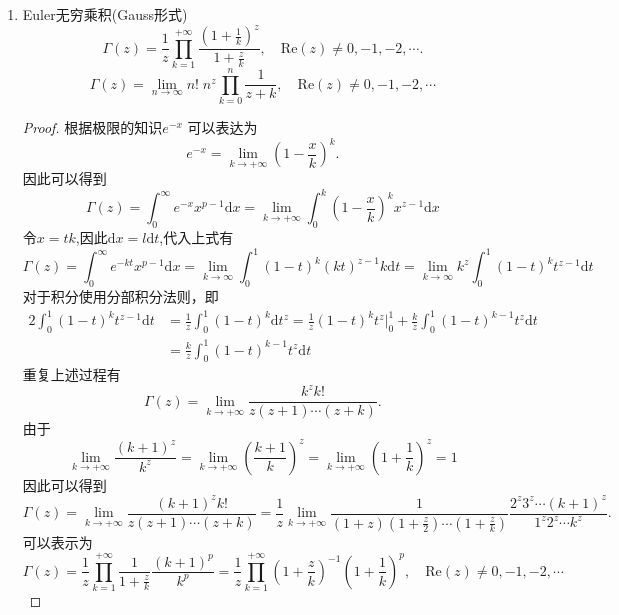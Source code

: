 \begin{property}
\begin{enumerate}[noitemsep]
\begin{enumerate}[noitemsep]
			\item Euler无穷乘积(Gauss形式)
			\begin{equation}
			\Gamma\left(z\right)=\frac{1}{z}\prod _{k=1}^{+\infty}{\frac {\left(1+\frac{1}{k}\right)^{z}}{1+{\frac{z}{k}}}},\quad \mathrm{Re}\left(z\right) \ne  0,-1,-2,\cdots.
			\end{equation}
			\begin{equation}
			\Gamma\left(z\right) = \lim_{n \to {\infty}} n! \; n^z\prod_{k=0}^{n}{\frac{1}{z+k}},\quad \mathrm{Re}(z) \ne 0,-1,-2,\cdots
			\end{equation}
			\begin{proof}	
				根据极限的知识$e^{-x}$
				可以表达为$$e^{-x}=\lim _{k \rightarrow +\infty}\left(1-\frac{x}{k}\right)^{k}.$$		
				因此可以得到$$\Gamma\left(z\right) = \int_{0}^{\infty} e^{-x} x^{p-1} \mathrm{d} x=\lim _{k \rightarrow +\infty} \int_{0}^{k}\left(1-\frac{x}{k}\right)^{k} x^{z-1}  \mathrm{d}  x$$
				令$x = tk$,因此$\mathrm{d}x = l\mathrm{d}t $,代入上式有
				$$\Gamma\left(z\right) = \int_{0}^{\infty} e^{-kt} x^{p-1} \mathrm{d} x=\lim _{k \rightarrow \infty} \int_{0}^{1}\left(1-t\right)^{k} (kt)^{z-1} k\mathrm{d} t = \lim _{k \rightarrow \infty} k^z \int_{0}^{1}\left(1-t\right)^{k} t^{z-1}  \mathrm{d} t$$
				对于积分使用分部积分法则，即
				\begin{alignat*}{2}
				\int_{0}^{1}\left(1-t\right)^{k} t^{z-1} \mathrm{d} t & = \frac{1}{z} \int_{0}^{1}\left(1-t\right)^{k} \mathrm{d} t^z =  \frac{1}{z} \left(1-t\right)^{k} t^z \Big| ^1_0 + \frac{k}{z} \int_{0}^{1}\left(1-t\right)^{k-1}t^z \mathrm{d} t\\
				& = \frac{k}{z} \int_{0}^{1}\left(1-t\right)^{k-1}t^z \mathrm{d} t
				\end{alignat*}
				重复上述过程有
				$$\Gamma\left(z\right) = \lim _{k \rightarrow +\infty} {\frac{k^z k!}{z(z+1)\cdots(z+k)}}.$$
				由于
				$$
				\lim _{k \rightarrow +\infty} \frac{\left(k+1\right)^z}{k^z} = \lim _{k \rightarrow +\infty}{\left(\frac{k+1}{k}\right)^z} = \lim _{k \rightarrow +\infty}{\left(1+\frac{1}{k}\right)^z} = 1
				$$
				因此可以得到
				$$\Gamma\left(z\right) = \lim _{k \rightarrow +\infty} {\frac{\left(k+1\right)^z k!}{z\left(z+1\right)\cdots\left(z+k \right)}} = \frac{1}{z}\lim _{k \rightarrow +\infty}{\frac{1}{\left(1+z \right)\left(1+\frac{z}{2}\right)\cdots \left(1+\frac{z}{k}\right)}} \frac{2^z3^z\cdots \left(k+1\right)^z}{1^z2^z\cdots k^z}.$$
				可以表示为
				$$\Gamma\left(z\right) = \frac{ 1}{z} \prod_{k = 1}^{+\infty}\frac{1}{1+\frac{z}{k}}\frac{\left(k+1\right)^p}{k^p} = \frac{1}{z} \prod_{k = 1}^{+\infty}\left(1+\frac{z}{k}\right)^{-1}\left(1+\frac{1}{k}\right)^p,\quad \mathrm{Re}(z) \ne 0,-1,-2,\cdots $$
			\end{proof}	
			

\end{enumerate}
\end{enumerate}
\end{property}
